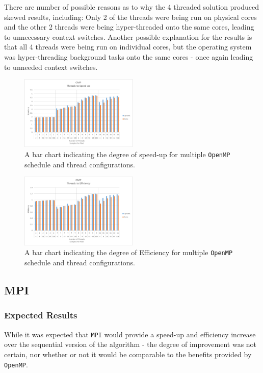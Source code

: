 \documentclass[journal,transmag]{IEEEtran}
\begin{document}
			There are number of possible reasons as to why the 4 threaded solution produced skewed results, including: Only 2 of the threads were being run on physical cores and the other 2 threads were being hyper-threaded onto the same cores, leading to unnecessary context switches. Another possible explanation for the results is that all 4 threads were being run on individual cores, but the operating system was hyper-threading background tasks onto the same cores - once again leading to unneeded context switches. 
			
		\begin{figure}[h]
			\centering
			\includegraphics[width = 0.5\textwidth]{chartOMPSpeed}
			\caption{A bar chart indicating the degree of speed-up for multiple \texttt{OpenMP} schedule and thread configurations.}
			\label{fig_omp_speed}
		\end{figure}
		
		\begin{figure}[h]
			\centering
			\includegraphics[width = 0.5\textwidth]{chartOMPEff}
			\caption{A bar chart indicating the degree of Efficiency for multiple \texttt{OpenMP} schedule and thread configurations.}
			\label{fig_omp_eff}
		\end{figure}
		
	\subsection{MPI}
		\subsubsection{Expected Results}
			While it was expected that \texttt{MPI} would provide a speed-up and efficiency increase over the sequential version of the algorithm - the degree of improvement was not certain, nor whether or not it would be comparable to the benefits provided by \texttt{OpenMP}.
			
\end{document}
